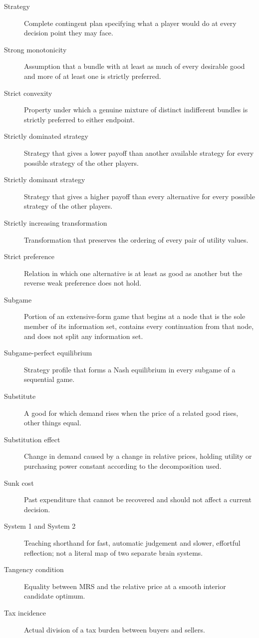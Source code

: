 \begin{description}
  \item[Strategy] Complete contingent plan specifying what a player would do at every decision point they may face.
  \item[Strong monotonicity] Assumption that a bundle with at least as much of every desirable good and more of at least one is strictly preferred.
  \item[Strict convexity] Property under which a genuine mixture of distinct indifferent bundles is strictly preferred to either endpoint.
  \item[Strictly dominated strategy] Strategy that gives a lower payoff than another available strategy for every possible strategy of the other players.
  \item[Strictly dominant strategy] Strategy that gives a higher payoff than every alternative for every possible strategy of the other players.
  \item[Strictly increasing transformation] Transformation that preserves the ordering of every pair of utility values.
  \item[Strict preference] Relation in which one alternative is at least as good as another but the reverse weak preference does not hold.
  \item[Subgame] Portion of an extensive-form game that begins at a node that
  is the sole member of its information set, contains every continuation from
  that node, and does not split any information set.
  \item[Subgame-perfect equilibrium] Strategy profile that forms a Nash equilibrium in every subgame of a sequential game.
  \item[Substitute] A good for which demand rises when the price of a related good rises, other things equal.
  \item[Substitution effect] Change in demand caused by a change in relative prices, holding utility or purchasing power constant according to the decomposition used.
  \item[Sunk cost] Past expenditure that cannot be recovered and should not affect a current decision.
  \item[System 1 and System 2] Teaching shorthand for fast, automatic judgement and slower, effortful reflection; not a literal map of two separate brain systems.
  \item[Tangency condition] Equality between MRS and the relative price at a smooth interior candidate optimum.
  \item[Tax incidence] Actual division of a tax burden between buyers and sellers.

\end{description}
